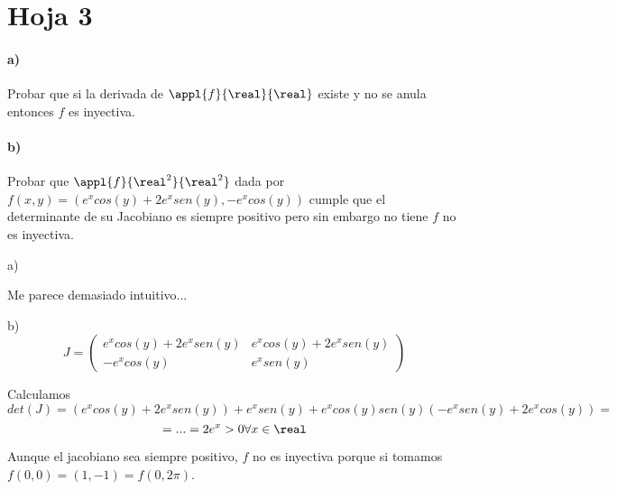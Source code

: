 \documentclass{apuntes}
\begin{document}
\section{Hoja 3}
\begin{problem}[3]
\paragraph{a)} Probar que si la derivada de $\appl{f}{\real}{\real}$ existe y no se anula entonces $f$ es inyectiva.
\paragraph{b)} Probar que $\appl{f}{\real^2}{\real^2}$ dada por $f(x,y) =( e^xcos(y) + 2e^xsen(y),-e^xcos(y))$ cumple que el determinante de su Jacobiano es siempre positivo pero sin embargo no tiene $f$ no es inyectiva.

\solution

a)

Me parece demasiado intuitivo...

b)
$$J = \begin{pmatrix}
       e^xcos(y)+2e^xsen(y) & e^xcos(y)+2e^xsen(y) \\
       -e^xcos(y) & e^xsen(y)
      \end{pmatrix}
$$

Calculamos $$det(J) = (e^xcos(y)+2e^xsen(y))+e^xsen(y) + e^xcos(y)sen(y)(-e^xsen(y)+2e^xcos(y)) = $$
$$ = ... = 2e^x > 0 \forall x \in \real$$

Aunque el jacobiano sea siempre positivo, $f$ no es inyectiva porque si tomamos $f(0,0) = (1,-1) = f(0,2\pi)$.
\end{problem}
\end{document}
